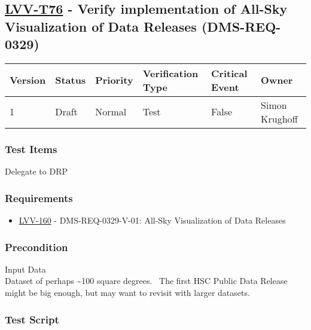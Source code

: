 \hypertarget{lvv-t76---verify-implementation-of-all-sky-visualization-of-data-releases-dms-req-0329}{%
\subsection{\texorpdfstring{\href{https://jira.lsstcorp.org/secure/Tests.jspa\#/testCase/LVV-T76}{LVV-T76}
- Verify implementation of All-Sky Visualization of Data Releases
(DMS-REQ-0329)}{LVV-T76 - Verify implementation of All-Sky Visualization of Data Releases (DMS-REQ-0329)}}\label{lvv-t76---verify-implementation-of-all-sky-visualization-of-data-releases-dms-req-0329}}

\begin{longtable}[]{@{}llllll@{}}
\toprule
Version & Status & Priority & Verification Type & Critical Event &
Owner\tabularnewline
\midrule
\endhead
1 & Draft & Normal & Test & False & Simon Krughoff\tabularnewline
\bottomrule
\end{longtable}

\hypertarget{test-items-165}{%
\subsubsection{Test Items}\label{test-items-165}}

Delegate to DRP

\hypertarget{requirements-166}{%
\subsubsection{Requirements}\label{requirements-166}}

\begin{itemize}
\tightlist
\item
  \href{https://jira.lsstcorp.org/browse/LVV-160}{LVV-160} -
  DMS-REQ-0329-V-01: All-Sky Visualization of Data Releases
\end{itemize}

\hypertarget{precondition-7}{%
\subsubsection{Precondition}\label{precondition-7}}

Input Data\\
Dataset of perhaps \textasciitilde{}100 square degrees. ~The first HSC
Public Data Release might be big enough, but may want to revisit with
larger datasets.

\hypertarget{test-script-166}{%
\subsubsection{Test Script}\label{test-script-166}}

